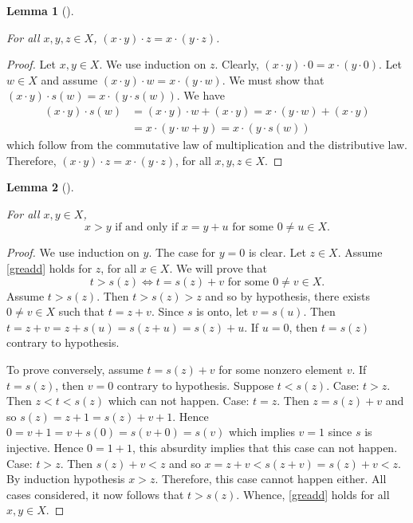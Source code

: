 \documentclass[
  letterpaper,
  10pt,
  reqno,
  twopage,
  openany]{book}
\theoremstyle{plain}
\newtheorem{lemma}{Lemma}[chapter]
\theoremstyle{definition}
\theoremstyle{definition}
\theoremstyle{definition}
\theoremstyle{plain}
\theoremstyle{plain}
\theoremstyle{remark}
\begin{document}
\leavevmode{}%
\begin{lemma}[]\label{lem-}

For all \(x,y,z\in X\), \((x\cdot y)\cdot z=x\cdot (y\cdot z)\).

\end{lemma}

\begin{proof}

Let \(x,y\in X\). We use induction on \(z\). Clearly,
\((x\cdot y)\cdot 0=x\cdot (y\cdot 0)\). Let \(w\in X\) and assume
\((x\cdot y)\cdot w=x\cdot (y\cdot w)\). We must show that
\((x\cdot y)\cdot s(w)=x\cdot (y\cdot s(w))\). We have \begin{align*}
(x\cdot y)\cdot s(w)
& =(x\cdot y)\cdot w+(x\cdot y)
=x\cdot (y\cdot w)+(x\cdot y) \\
& =x\cdot (y\cdot w+ y)
=x\cdot (y\cdot s(w))
\end{align*} which follow from the commutative law of multiplication and
the distributive law. Therefore,
\((x\cdot y)\cdot z=x\cdot (y\cdot z)\), for all \(x,y,z\in X\).

\end{proof}

\leavevmode{}%
\begin{lemma}[]\label{lem-}

\label{lemorder} For all \(x,y\in X\), \begin{equation}
\label{greadd}
x> y \text{ if and only if } x=y+u \text{ for some } 0\neq u\in X.
\end{equation}

\end{lemma}

\begin{proof}

We use induction on \(y\). The case for \(y=0\) is clear. Let
\(z\in X\). Assume \ref{greadd} holds for \(z\), for all \(x\in X\). We
will prove that \[
t>s(z) \Leftrightarrow t=s(z)+v \text{ for some } 0\neq v\in X. 
\] Assume \(t>s(z)\). Then \(t>s(z)>z\) and so by hypothesis, there
exists \(0\neq v\in X\) such that \(t=z+v\). Since \(s\) is onto, let
\(v=s(u)\). Then \(t=z+v=z+s(u)=s(z+u)=s(z)+u\). If \(u=0\), then
\(t=s(z)\) contrary to hypothesis.

\par

To prove conversely, assume \(t=s(z)+v\) for some nonzero element \(v\).
If \(t=s(z)\), then \(v=0\) contrary to hypothesis. Suppose \(t<s(z)\).
Case: \(t>z\). Then \(z<t<s(z)\) which can not happen. Case: \(t=z\).
Then \(z=s(z)+v\) and so \(s(z)=z+1=s(z)+v+1\). Hence
\(0=v+1=v+s(0)=s(v+0)=s(v)\) which implies \(v=1\) since \(s\) is
injective. Hence \(0=1+1\), this absurdity implies that this case can
not happen. Case: \(t>z\). Then \(s(z)+v<z\) and so
\(x=z+v<s(z+v)=s(z)+v<z\). By induction hypothesis \(x>z\). Therefore,
this case cannot happen either. All cases considered, it now follows
that \(t>s(z)\). Whence, \ref{greadd} holds for all \(x,y\in X\).

\end{proof}
\end{document}
